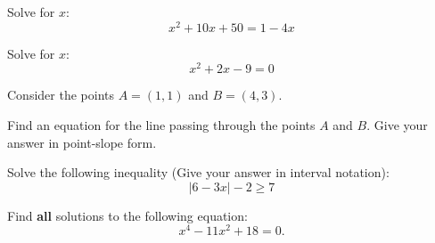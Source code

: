 \begin{questions}

    

\newpage

\question[7] Solve for $x$:
    \[ x^2 + 10x +50 = 1-4x\]
    \vfill%

\question[7] Solve for $x$:
    \[ x^2+2x-9=0 \]
    \vfill

\newpage

\question[5] Consider the points $A=(1,1)$ and $B=(4,3)$.

     Find an equation for the line passing through the points $A$ and $B$. Give your answer in point-slope form.
        \vfill



\question[7] Solve the following inequality (Give your answer in interval notation):
    \[|6-3x|-2\geq 7\]
    \vspace{9cm}

\newpage %

 \question[6] 

    Find \textbf{all} solutions to the following equation: 
    \[ x^4 -11x^2  +18= 0.\]
        \vfill
    


\end{questions}
